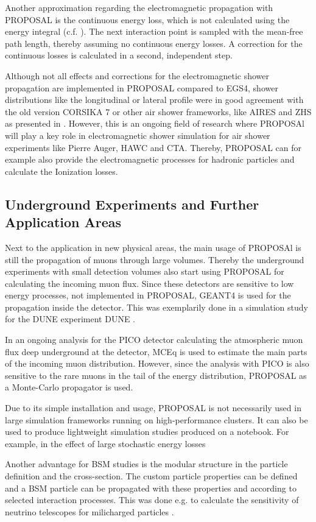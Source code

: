 Another approximation regarding the electromagnetic propagation with PROPOSAL is the continuous energy loss, which is not calculated using the energy integral (c.f. ).
The next interaction point is sampled with the mean-free path length, thereby assuming no continuous energy losses.
A correction for the continuous losses is calculated in a second, independent step.

Although not all effects and corrections for the electromagnetic shower propagation are implemented in PROPOSAL compared to EGS4, shower distributions like the longitudinal or lateral profile were in good agreement with the old version CORSIKA 7 or other air shower frameworks, like AIRES and ZHS as presented in \cite{Alameddine21ICRC}.
However, this is an ongoing field of research where PROPOSAl will play a key role in electromagnetic shower simulation for air shower experiments like Pierre Auger, HAWC and CTA.
Thereby, PROPOSAL can for example also provide the electromagnetic processes for hadronic particles and calculate the Ionization losses.

%

\subsection{Underground Experiments and Further Application Areas}

Next to the application in new physical areas, the main usage of PROPOSAl is still the propagation of muons through large volumes.
Thereby the underground experiments with small detection volumes also start using PROPOSAL for calculating the incoming muon flux.
Since these detectors are sensitive to low energy processes, not implemented in PROPOSAL, GEANT4 is used for the propagation inside the detector.
This was exemplarily done in a simulation study for the DUNE experiment DUNE \cite{Schneider21DUNE}.

In an ongoing analysis for the PICO detector calculating the atmospheric muon flux deep underground at the detector, MCEq is used to estimate the main parts of the incoming muon distribution.
However, since the analysis with PICO is also sensitive to the rare muons in the tail of the energy distribution, PROPOSAL as a Monte-Carlo propagator is used.

Due to its simple installation and usage, PROPOSAL is not necessarily used in large simulation frameworks running on high-performance clusters.
It can also be used to produce lightweight simulation studies produced on a notebook.
For example, in \cite{GarciaFernandez2020RNOG} the effect of large stochastic energy losses 

Another advantage for BSM studies is the modular structure in the particle definition and the cross-section.
The custom particle properties can be defined and a BSM particle can be propagated with these properties and according to selected interaction processes.
This was done e.g. to calculate the sensitivity of neutrino telescopes for milicharged particles \cite{Arguelles21MiliCharged}.

